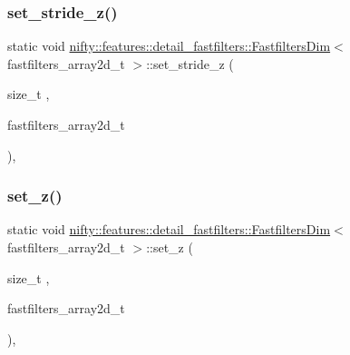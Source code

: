 \subsubsection{\texorpdfstring{set\+\_\+stride\+\_\+z()}{set\_stride\_z()}}
{\footnotesize\ttfamily static void \hyperlink{structnifty_1_1features_1_1detail__fastfilters_1_1FastfiltersDim}{nifty\+::features\+::detail\+\_\+fastfilters\+::\+Fastfilters\+Dim}$<$ fastfilters\+\_\+array2d\+\_\+t $>$\+::set\+\_\+stride\+\_\+z (\begin{DoxyParamCaption}\item[{size\+\_\+t}]{,  }\item[{fastfilters\+\_\+array2d\+\_\+t}]{ }\end{DoxyParamCaption})\hspace{0.3cm}{\ttfamily [inline]}, {\ttfamily [static]}}

\mbox{\label{structnifty_1_1features_1_1detail__fastfilters_1_1FastfiltersDim_3_01fastfilters__array2d__t_01_4_a0e101cf599880535412ae133a320baaa}} 
\subsubsection{\texorpdfstring{set\+\_\+z()}{set\_z()}}
{\footnotesize\ttfamily static void \hyperlink{structnifty_1_1features_1_1detail__fastfilters_1_1FastfiltersDim}{nifty\+::features\+::detail\+\_\+fastfilters\+::\+Fastfilters\+Dim}$<$ fastfilters\+\_\+array2d\+\_\+t $>$\+::set\+\_\+z (\begin{DoxyParamCaption}\item[{size\+\_\+t}]{,  }\item[{fastfilters\+\_\+array2d\+\_\+t}]{ }\end{DoxyParamCaption})\hspace{0.3cm}{\ttfamily [inline]}, {\ttfamily [static]}}



